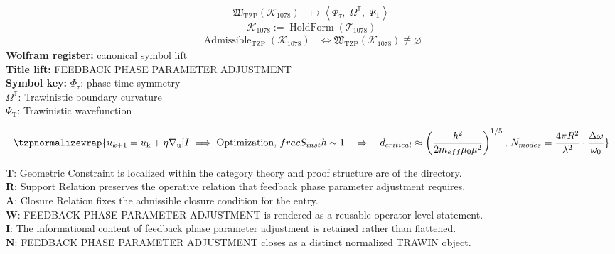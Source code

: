 \noindent
\begin{minipage}[t]{0.48\linewidth}
\begingroup
\small
\[
\begin{aligned}
\mathfrak{W}_{\mathrm{TZP}}\!\left(\mathcal{K}_{1078}\right)
&\longmapsto
\left\langle \Phi_{\tau},\; \Omega^{\mathbb{T}},\; \Psi_{\mathrm{T}} \right\rangle
\end{aligned}
\]
\[
\mathcal{K}_{1078}
:=
\operatorname{HoldForm}\!\left(\mathcal{T}_{1078}\right)
\]
\[
\begin{aligned}
\operatorname{Admissible}_{\mathrm{TZP}}\!\left(\mathcal{K}_{1078}\right)
&\Longleftrightarrow
\mathfrak{W}_{\mathrm{TZP}}\!\left(\mathcal{K}_{1078}\right)\not\equiv\varnothing
\end{aligned}
\]
\textbf{Wolfram register:} canonical symbol lift\\
\textbf{Title lift:} FEEDBACK PHASE PARAMETER ADJUSTMENT\\
\textbf{Symbol key:} \(\Phi_{\tau}\): phase-time symmetry\\ \(\Omega^{\mathbb{T}}\): Trawinistic boundary curvature\\ \(\Psi_{\mathrm{T}}\): Trawinistic wavefunction
\par
\endgroup
\end{minipage}\hfill
\begin{minipage}[t]{0.48\linewidth}
\[
\tzpnormalizewrap{u_{k+1} = u_{\mathrm{k}} + \eta \nabla_{\mathrm{u}} [I \implies \text{Optimization},\,frac{S_{inst}}{\hbar} \sim 1 \quad \Rightarrow \quad d_{critical} \approx \left(\frac{\hbar^2}{2m_{eff}\mu_0\mu^2}\right)^{1/5},\,N_{modes} = \frac{4\pi R^2}{\lambda^2} \cdot \frac{\Delta\omega}{\omega_0}}
\]

\small
\textbf{T}: Geometric Constraint is localized within the category theory and proof structure arc of the directory.\\
\textbf{R}: Support Relation preserves the operative relation that feedback phase parameter adjustment requires.\\
\textbf{A}: Closure Relation fixes the admissible closure condition for the entry.\\
\textbf{W}: FEEDBACK PHASE PARAMETER ADJUSTMENT is rendered as a reusable operator-level statement.\\
\textbf{I}: The informational content of feedback phase parameter adjustment is retained rather than flattened.\\
\textbf{N}: FEEDBACK PHASE PARAMETER ADJUSTMENT closes as a distinct normalized TRAWIN object.
\normalsize
\end{minipage}

